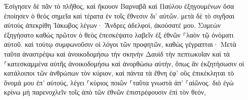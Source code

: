 \documentclass{openreader}
\begin{document}
Ἐσίγησεν δὲ πᾶν τὸ πλῆθος, καὶ ἤκουον Βαρναβᾶ καὶ Παύλου ἐξηγουμένων ὅσα ἐποίησεν ὁ θεὸς σημεῖα καὶ τέρατα ἐν τοῖς ἔθνεσιν δι’ αὐτῶν. 
μετὰ δὲ τὸ σιγῆσαι αὐτοὺς ἀπεκρίθη Ἰάκωβος λέγων· Ἄνδρες ἀδελφοί, ἀκούσατέ μου. 
Συμεὼν ἐξηγήσατο καθὼς πρῶτον ὁ θεὸς ἐπεσκέψατο λαβεῖν ἐξ ἐθνῶν ⸀λαὸν τῷ ὀνόματι αὐτοῦ. 
καὶ τούτῳ συμφωνοῦσιν οἱ λόγοι τῶν προφητῶν, καθὼς γέγραπται· 
Μετὰ ταῦτα ἀναστρέψω καὶ ἀνοικοδομήσω τὴν σκηνὴν Δαυὶδ τὴν πεπτωκυῖαν καὶ τὰ ⸀κατεσκαμμένα αὐτῆς ἀνοικοδομήσω καὶ ἀνορθώσω αὐτήν, 
ὅπως ἂν ἐκζητήσωσιν οἱ κατάλοιποι τῶν ἀνθρώπων τὸν κύριον, καὶ πάντα τὰ ἔθνη ἐφ’ οὓς ἐπικέκληται τὸ ὄνομά μου ἐπ’ αὐτούς, λέγει ⸀κύριος ποιῶν ⸀ταῦτα 
γνωστὰ ἀπ’ ⸀αἰῶνος. 
διὸ ἐγὼ κρίνω μὴ παρενοχλεῖν τοῖς ἀπὸ τῶν ἐθνῶν ἐπιστρέφουσιν ἐπὶ τὸν θεόν, 
\end{document}
